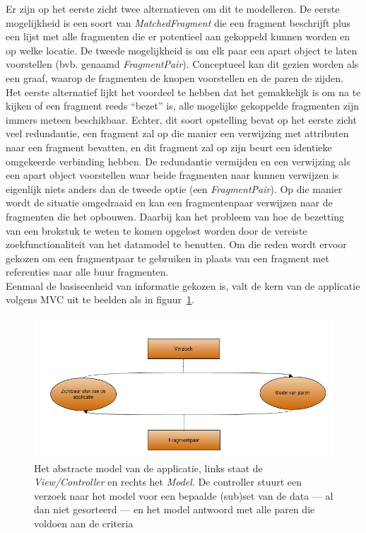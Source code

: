 Er zijn op het eerste zicht twee alternatieven om dit te modelleren. De eerste mogelijkheid is een soort van \emph{MatchedFragment} die een fragment beschrijft plus een lijst met alle fragmenten die er potentieel aan gekoppeld kunnen worden en op welke locatie. De tweede mogelijkheid is om elk paar een apart object te laten voorstellen (bvb. genaamd \emph{FragmentPair}). Conceptueel kan dit gezien worden als een graaf, waarop de fragmenten de knopen voorstellen en de paren de zijden. Het eerste alternatief lijkt het voordeel te hebben dat het gemakkelijk is om na te kijken of een fragment reeds ``bezet'' is, alle mogelijke gekoppelde fragmenten zijn immers meteen beschikbaar. Echter, dit soort opstelling bevat op het eerste zicht veel redundantie, een fragment zal op die manier een verwijzing met attributen naar een fragment bevatten, en dit fragment zal op zijn beurt een identieke omgekeerde verbinding hebben. De redundantie vermijden en een verwijzing als een apart object voorstellen waar beide fragmenten naar kunnen verwijzen is eigenlijk niets anders dan de tweede optie (een \emph{FragmentPair}). Op die manier wordt de situatie omgedraaid en kan een fragmentenpaar verwijzen naar de fragmenten die het opbouwen. Daarbij kan het probleem van hoe de bezetting van een brokstuk te weten te komen opgelost worden door de vereiste zoekfunctionaliteit van het datamodel te benutten. Om die reden wordt ervoor gekozen om een fragmentpaar te gebruiken in plaats van een fragment met referenties naar alle buur fragmenten.\\

Eenmaal de basiseenheid van informatie gekozen is, valt de kern van de applicatie volgens MVC uit te beelden als in figuur~\ref{fig:basicprogramflow}.

\begin{figure}[ht]
	\begin{center}
		\includegraphics[width=1.0\columnwidth]{images/BasicExecutionFlow.png}
		\caption{Het abstracte model van de applicatie, links staat de \emph{View/Controller} en rechts het \emph{Model}. De controller stuurt een verzoek naar het model voor een bepaalde (sub)set van de data --- al dan niet gesorteerd --- en het model antwoord met alle paren die voldoen aan de criteria}
		\label{fig:basicprogramflow}
	\end{center}
\end{figure}

